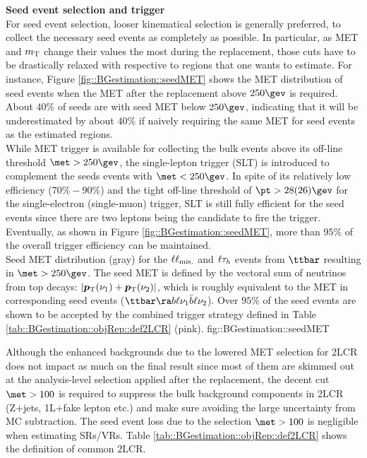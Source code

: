 \noindent \textbf{Seed event selection and trigger} \\
For seed event selection, looser kinematical selection is generally preferred, to collect the necessary seed events as completely as possible. In particular, as MET and $m_{\mathrm{T}}$ change their values the most during the replacement, those cuts have to be drastically relaxed with respective to regions that one wants to estimate. 
For instance, Figure \ref{fig::BGestimation::seedMET} shows the MET distribution of seed events when the MET after the replacement above  $250\gev$ is required. About $40\%$ of seeds are with seed MET below $250\gev$, indicating that it will be underestimated by about $40\%$ if naively requiring the same MET for seed events as the estimated regions. \\ 

While MET trigger is available for collecting the bulk events above its off-line threshold $\met>250\gev$, the single-lepton trigger (SLT) is introduced to complement the seeds events with $\met<250\gev$.
In spite of its relatively low efficiency ($70\%-90\%$) and the tight off-line threshold of $\pt > 28 (26) \gev$ for the single-electron (single-muon) trigger, SLT is still fully efficient for the seed events since there are two leptons being the candidate to fire the trigger. Eventually, as shown in Figure \ref{fig::BGestimation::seedMET}, more than $95\%$ of the overall trigger efficiency can be maintained. \\

{Seed MET distribution (gray) for the $\ell\ell_{\mathrm{mis.}}$ and $\ell\tau_h$ events from $\ttbar$ resulting in $\met>250\gev$. The seed MET is defined by the vectoral sum of neutrinos from top decays: $\left|\bm{p}_{\mathrm{T}}(\nu_1)+\bm{p}_{\mathrm{T}}(\nu_2)\right|$, which is roughly equivalent to the MET in corresponding seed events ($\ttbar \ra b\ell\nu_1 \bar{b}\ell\nu_2$). Over $95\%$ of the seed events are shown to be accepted by the combined trigger strategy defined in Table \ref{tab::BGestimation::objRep::def2LCR} (pink). }
{fig::BGestimation::seedMET}

Although the enhanced backgrounds due to the lowered MET selection for 2LCR does not impact as much on the final result since most of them are skimmed out at the analysis-level selection applied after the replacement, the decent cut $\met>100$ is required to suppress the bulk background components in 2LCR (Z+jets, 1L+fake lepton etc.) and make sure avoiding the large uncertainty from MC subtraction. The seed event loss due to the selection $\met>100$ is negligible when estimating SRs/VRs. Table \ref{tab::BGestimation::objRep::def2LCR} shows the definition of common 2LCR. \\

